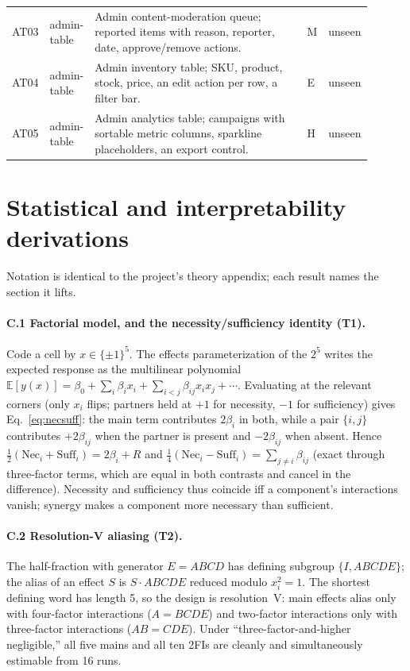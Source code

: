\begin{small}
\begin{longtable}{@{}p{0.045\linewidth}p{0.075\linewidth}p{0.70\linewidth}p{0.02\linewidth}p{0.055\linewidth}@{}}
AT03 & admin-table & Admin content-moderation queue; reported items with reason, reporter, date, approve/remove actions. & M & unseen \\
AT04 & admin-table & Admin inventory table; SKU, product, stock, price, an edit action per row, a filter bar. & E & unseen \\
AT05 & admin-table & Admin analytics table; campaigns with sortable metric columns, sparkline placeholders, an export control. & H & unseen \\
\end{longtable}
\end{small}

\section{Statistical and interpretability derivations}
\label{app:theory}

Notation is identical to the project's theory appendix; each result names the section it lifts.

\paragraph{C.1 Factorial model, and the necessity/sufficiency identity (T1).} Code a cell by
$x\in\{\pm1\}^5$. The effects parameterization of the $2^5$ writes the expected response as the
multilinear polynomial $\mathbb{E}[y(x)]=\beta_0+\sum_i\beta_i x_i+\sum_{i<j}\beta_{ij}x_ix_j+\cdots$.
Evaluating at the relevant corners (only $x_i$ flips; partners held at $+1$ for necessity, $-1$ for
sufficiency) gives Eq.~\ref{eq:necsuff}: the main term contributes $2\beta_i$ in both, while a pair
$\{i,j\}$ contributes $+2\beta_{ij}$ when the partner is present and $-2\beta_{ij}$ when absent. Hence
$\tfrac12(\mathrm{Nec}_i+\mathrm{Suff}_i)=2\beta_i+R$ and
$\tfrac14(\mathrm{Nec}_i-\mathrm{Suff}_i)=\sum_{j\neq i}\beta_{ij}$ (exact through three-factor terms,
which are equal in both contrasts and cancel in the difference). Necessity and sufficiency thus coincide
iff a component's interactions vanish; synergy makes a component more necessary than sufficient.

\paragraph{C.2 Resolution-V aliasing (T2).} The half-fraction with generator $E{=}ABCD$ has defining
subgroup $\{I,ABCDE\}$; the alias of an effect $S$ is $S\cdot ABCDE$ reduced modulo $x_i^2{=}1$. The
shortest defining word has length 5, so the design is resolution~V: main effects alias only with
four-factor interactions ($A{=}BCDE$) and two-factor interactions only with three-factor interactions
($AB{=}CDE$). Under ``three-factor-and-higher negligible,'' all five mains and all ten 2FIs are cleanly
and simultaneously estimable from 16 runs.

